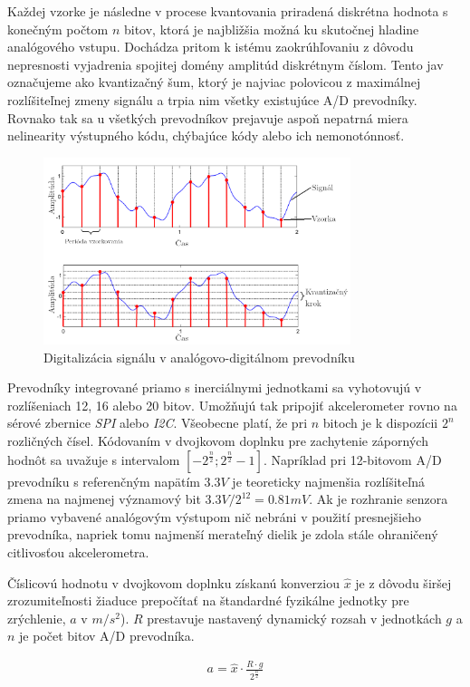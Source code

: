 Každej vzorke je následne v procese kvantovania priradená diskrétna hodnota s konečným počtom $n$ bitov, ktorá je najbližšia možná ku
skutočnej hladine analógového vstupu. Dochádza pritom k istému zaokrúhľovaniu z dôvodu nepresnosti vyjadrenia spojitej domény amplitúd
diskrétnym číslom. Tento jav označujeme ako kvantizačný šum, ktorý je najviac polovicou z maximálnej rozlíšiteľnej zmeny signálu a
trpia nim všetky existujúce A/D prevodníky. Rovnako tak sa u všetkých prevodníkov prejavuje aspoň nepatrná miera nelinearity výstupného
kódu, chýbajúce kódy alebo ich nemonotónnosť.

\begin{figure}[h]
	\centering
	\includegraphics[width=0.8\textwidth]{figures/analog-to-digital-conversion.png}
	\caption{Digitalizácia signálu v analógovo-digitálnom prevodníku}
\end{figure}

Prevodníky integrované priamo s inerciálnymi jednotkami sa vyhotovujú v rozlíšeniach 12, 16 alebo 20 bitov. Umožňujú tak pripojiť
akcelerometer rovno na sérové zbernice \emph{SPI} alebo \emph{I2C}. Všeobecne platí, že pri $n$ bitoch je k dispozícii $2^n$ rozličných
čísel. Kódovaním v dvojkovom doplnku pre zachytenie záporných hodnôt sa uvažuje s intervalom $[-2^\frac{n}{2}; 2^\frac{n}{2} - 1]$.
Napríklad pri 12-bitovom A/D prevodníku s referenčným napätím $3.3V$ je teoreticky najmenšia rozlíšiteľná zmena na najmenej významový
bit $3.3V / 2^{12} = 0.81 mV$. Ak je rozhranie senzora priamo vybavené analógovým výstupom nič nebráni v použití presnejšieho
prevodníka, napriek tomu najmenší merateľný dielik je zdola stále ohraničený citlivosťou akcelerometra.

Číslicovú hodnotu v dvojkovom doplnku získanú konverziou $\hat{x}$ je z dôvodu širšej zrozumiteľnosti žiaduce prepočítať na
štandardné fyzikálne jednotky pre zrýchlenie, $a$ v $m/s^2$). $R$ prestavuje nastavený dynamický rozsah v jednotkách $g$ a $n$
je počet bitov A/D prevodníka.
\begin{ceqn}\begin{align}
   a = \hat{x} \cdot \frac{R \cdot g}{2^\frac{n}{2}}
\end{align}\end{ceqn}

